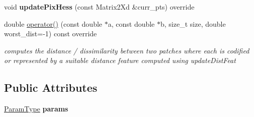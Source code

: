 \begin{DoxyCompactItemize}
\item 
\hypertarget{classSCV_a50e94b3477bc1d951991c5f05f528c05}{void {\bfseries update\-Pix\-Hess} (const Matrix2\-Xd \&curr\-\_\-pts) override}\label{classSCV_a50e94b3477bc1d951991c5f05f528c05}

\item 
\hypertarget{classSCV_a504ece6542207c25f088fadb507463df}{double \hyperlink{classSCV_a504ece6542207c25f088fadb507463df}{operator()} (const double $\ast$a, const double $\ast$b, size\-\_\-t size, double worst\-\_\-dist=-\/1) const override}\label{classSCV_a504ece6542207c25f088fadb507463df}

\begin{DoxyCompactList}\small\item\em computes the distance / dissimilarity between two patches where each is codified or represented by a suitable distance feature computed using update\-Dist\-Feat \end{DoxyCompactList}\end{DoxyCompactItemize}
\subsection*{Public Attributes}
\begin{DoxyCompactItemize}
\item 
\hypertarget{classSCV_af94023a052cd2f1dc315c210beef6ac1}{\hyperlink{structSCVParams}{Param\-Type} {\bfseries params}}\label{classSCV_af94023a052cd2f1dc315c210beef6ac1}

\end{DoxyCompactItemize}
